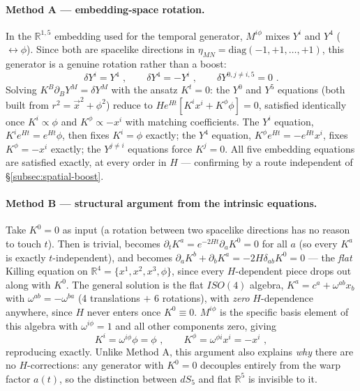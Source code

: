\documentclass[11pt]{article}
\begin{document}
\paragraph{Method A --- embedding-space rotation.}
In the $\mathbb{R}^{1,5}$ embedding  used for the temporal generator,
$M^{i\phi}$ mixes $Y^i$ and $Y^4$ ($\leftrightarrow\phi$). Since both are spacelike directions
in $\eta_{MN}=\mathrm{diag}(-1,+1,\ldots,+1)$, this generator is a genuine rotation rather than
a boost:
\begin{equation}
\label{eq:spatial-rotation-action}
\delta Y^i = Y^4 \,\,, \qquad \delta Y^4 = -Y^i \,\,, \qquad \delta Y^{0,j\neq i,5}=0 \,\,.
\end{equation}
Solving $K^B\partial_BY^M=\delta Y^M$ with the ansatz $K^t=0$: the $Y^0$ and $Y^5$ equations
(both built from $r^2=\vec{x}^2+\phi^2$) reduce to $He^{Ht}\left[K^ix^i+K^\phi\phi\right]=0$,
satisfied identically once $K^i\propto\phi$ and $K^\phi\propto-x^i$ with matching coefficients.
The $Y^i$ equation, $K^ie^{Ht}=e^{Ht}\phi$, then fixes $K^i=\phi$ exactly; the $Y^4$ equation,
$K^\phi e^{Ht}=-e^{Ht}x^i$, fixes $K^\phi=-x^i$ exactly; the $Y^{j\neq i}$ equations force
$K^j=0$. All five embedding equations are satisfied exactly, at every order in $H$ ---
confirming  by a route independent of \S\ref{subsec:spatial-boost}.

\paragraph{Method B --- structural argument from the intrinsic equations.}
Take $K^0=0$ as input (a rotation between two spacelike directions has no reason to touch
$t$). Then  is trivial,  becomes $\partial_tK^a=e^{-2Ht}\partial_aK^0=0$
for all $a$ (so every $K^a$ is exactly $t$-independent), and  becomes
$\partial_aK^b+\partial_bK^a=-2H\delta_{ab}K^0=0$ --- the \emph{flat} Killing equation on
$\mathbb{R}^4=\{x^1,x^2,x^3,\phi\}$, since every $H$-dependent piece drops out along with
$K^0$. The general solution is the flat $ISO(4)$ algebra, $K^a=c^a+\omega^{ab}x_b$ with
$\omega^{ab}=-\omega^{ba}$ (4 translations $+$ 6 rotations), with \emph{zero} $H$-dependence
anywhere, since $H$ never enters once $K^0\equiv0$. $M^{i\phi}$ is the specific basis element
of this algebra with $\omega^{i\phi}=1$ and all other components zero, giving
\begin{equation}
\label{eq:crosscheck-spatial-result}
K^i=\omega^{i\phi}\phi=\phi \,\,, \qquad K^\phi=\omega^{\phi i}x^i=-x^i \,\,,
\end{equation}
reproducing  exactly. Unlike Method A, this argument also explains
\emph{why} there are no $H$-corrections: any generator with $K^0=0$ decouples entirely from
the warp factor $a(t)$, so the distinction between $dS_5$ and flat $\mathbb{R}^5$ is invisible
to it.
\end{document}
